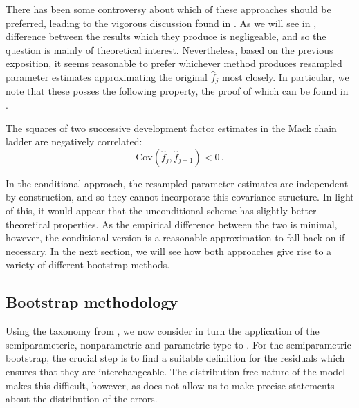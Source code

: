 \documentclass[a4paper]{book}
\begin{document}
There has been some controversy about which of these approaches should be preferred, leading to the vigorous discussion found in \cite{wuthrich:chain-ladder-msep, mack:msep, gisler:msep, venter:msep}. As we will see in , difference between the results which they produce is negligeable, and so the question is mainly of theoretical interest. Nevertheless, based on the previous exposition, it seems reasonable to prefer whichever method produces resampled parameter estimates approximating the original $\widehat{f}_j$ most closely. In particular, we note that these posses the following property, the proof of which can be found in \cite{mack:msep}.

\begin{theorem}
  The squares of two successive development factor estimates in the Mack chain ladder are negatively correlated:
  \begin{equation}
    \mathrm{Cov}(\widehat{f}_j, \widehat{f}_{j - 1}) < 0 \,.
  \end{equation}
\end{theorem}

\noindent In the conditional approach, the resampled parameter estimates are independent by construction, and so they cannot incorporate this covariance structure. In light of this, it would appear that the unconditional scheme has slightly better theoretical properties. As the empirical difference between the two is minimal, however, the conditional version is a reasonable approximation to fall back on if necessary. In the next section, we will see how both approaches give rise to a variety of different bootstrap methods.

\subsection{Bootstrap methodology} \label{subsec:mack-boot}

Using the taxonomy from , we now consider in turn the application of the semiparameteric, nonparametric and parametric type to . For the semiparametric bootstrap, the crucial step is to find a suitable definition for the residuals which ensures that they are interchangeable. The distribution-free nature of the model makes this difficult, however, as does not allow us to make precise statements about the distribution of the errors. 
\end{document}
